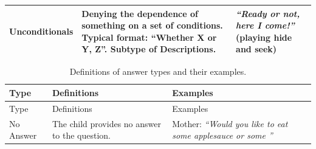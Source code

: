 \documentclass[floatsintext,man]{apa6}
\theoremstyle{definition}
\theoremstyle{definition}
\theoremstyle{definition}
\theoremstyle{remark}
\begin{document}
\begin{longtable}[]{@{}lll@{}}
\begin{minipage}[t]{0.14\columnwidth}\raggedright\strut
Unconditionals\strut
\end{minipage} & \begin{minipage}[t]{0.44\columnwidth}\raggedright\strut
Denying the dependence of something on a set of conditions. Typical
format: \enquote{Whether X or Y, Z}. Subtype of Descriptions.\strut
\end{minipage} & \begin{minipage}[t]{0.33\columnwidth}\raggedright\strut
\emph{\enquote{Ready or not, here I come!}} (playing hide and
seek)\strut
\end{minipage}\tabularnewline
\bottomrule
\end{longtable}

\begin{longtable}[]{@{}lll@{}}
\caption{\label{tab:answerTypes} Definitions of answer types and their
examples.}\tabularnewline
\toprule
\begin{minipage}[b]{0.18\columnwidth}\raggedright\strut
Type\strut
\end{minipage} & \begin{minipage}[b]{0.41\columnwidth}\raggedright\strut
Definitions\strut
\end{minipage} & \begin{minipage}[b]{0.33\columnwidth}\raggedright\strut
Examples\strut
\end{minipage}\tabularnewline
\midrule
\endfirsthead
\toprule
\begin{minipage}[b]{0.18\columnwidth}\raggedright\strut
Type\strut
\end{minipage} & \begin{minipage}[b]{0.41\columnwidth}\raggedright\strut
Definitions\strut
\end{minipage} & \begin{minipage}[b]{0.33\columnwidth}\raggedright\strut
Examples\strut
\end{minipage}\tabularnewline
\midrule
\endhead
\begin{minipage}[t]{0.18\columnwidth}\raggedright\strut
No Answer\strut
\end{minipage} & \begin{minipage}[t]{0.41\columnwidth}\raggedright\strut
The child provides no answer to the question.\strut
\end{minipage} & \begin{minipage}[t]{0.33\columnwidth}\raggedright\strut
Mother: \emph{\enquote{Would you like to eat some applesauce or some
}}
\end{minipage}
\end{longtable}
\end{document}
